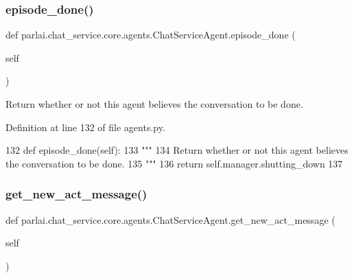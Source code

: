 \subsubsection{\texorpdfstring{episode\+\_\+done()}{episode\_done()}}
{\footnotesize\ttfamily def parlai.\+chat\+\_\+service.\+core.\+agents.\+Chat\+Service\+Agent.\+episode\+\_\+done (\begin{DoxyParamCaption}\item[{}]{self }\end{DoxyParamCaption})}

\begin{DoxyVerb}Return whether or not this agent believes the conversation to be done.
\end{DoxyVerb}
 

Definition at line 132 of file agents.\+py.


\begin{DoxyCode}
132     \textcolor{keyword}{def }episode\_done(self):
133         \textcolor{stringliteral}{"""}
134 \textcolor{stringliteral}{        Return whether or not this agent believes the conversation to be done.}
135 \textcolor{stringliteral}{        """}
136         \textcolor{keywordflow}{return} self.manager.shutting\_down
137 \end{DoxyCode}
\mbox{\label{classparlai_1_1chat__service_1_1core_1_1agents_1_1ChatServiceAgent_ac1fbe6b38906f3d52fb49dd682086866}} 
\subsubsection{\texorpdfstring{get\+\_\+new\+\_\+act\+\_\+message()}{get\_new\_act\_message()}}
{\footnotesize\ttfamily def parlai.\+chat\+\_\+service.\+core.\+agents.\+Chat\+Service\+Agent.\+get\+\_\+new\+\_\+act\+\_\+message (\begin{DoxyParamCaption}\item[{}]{self }\end{DoxyParamCaption})}


